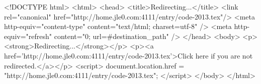 <!DOCTYPE html>
<html>
<head>
<title>Redirecting...</title>
<link rel="canonical" href="http://home.jle0.com:4111/entry/code-2013.tex"/>
<meta http-equiv="content-type" content="text/html; charset=utf-8" />
<meta http-equiv="refresh" content="0; url=#{destination_path}" />
</head>
<body>
  <p><strong>Redirecting...</strong></p>
  <p><a href='http://home.jle0.com:4111/entry/code-2013.tex'>Click here if you are not redirected.</a></p>
  <script>
    document.location.href = "http://home.jle0.com:4111/entry/code-2013.tex";
  </script>
</body>
</html>
